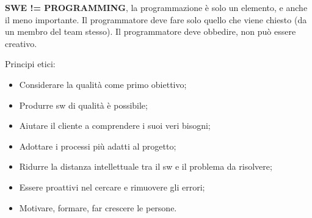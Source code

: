 \textbf{SWE != PROGRAMMING}, la programmazione è solo un elemento, e anche il meno importante. Il programmatore deve fare solo quello che viene chiesto (da un membro del team stesso). Il programmatore deve obbedire, non può essere creativo.

Principi etici:

\begin{itemize}

	\item Considerare la qualità come primo obiettivo;
	\item Produrre sw di qualità è possibile;
	\item Aiutare il cliente a comprendere i suoi veri bisogni;
	\item Adottare i processi più adatti al progetto;
	\item Ridurre la distanza intellettuale tra il sw e il problema da risolvere;
	\item Essere proattivi nel cercare e rimuovere gli errori;
	\item Motivare, formare, far crescere le persone.

\end{itemize}

